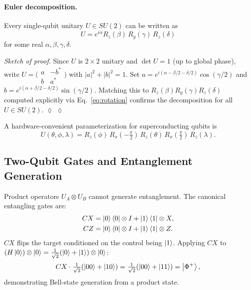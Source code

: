\documentclass[aps, reprint, twocolumn, superscriptaddress, floatfix]{revtex4-2}
\newenvironment{proofsketch}[1][Sketch of proof]{%
  \par\smallskip\noindent\textit{#1.}\enspace}{%
  \hspace*{\fill}$\lozenge$\par\smallskip}
\begin{document}
\paragraph{Euler decomposition.}
Every single-qubit unitary $U \in SU(2)$ can be written as
\begin{equation}
  U = e^{i\alpha}R_z(\beta)\,R_y(\gamma)\,R_z(\delta)
  \label{eq:euler}
\end{equation}
for some real $\alpha,\beta,\gamma,\delta$.

\begin{proofsketch}
Since $U$ is $2\times2$ unitary and $\det U=1$ (up to global phase), write
$U = \bigl(\begin{smallmatrix}a & -b^* \\ b & a^*\end{smallmatrix}\bigr)$ with
$|a|^2+|b|^2=1$.  Set $a = e^{i(\alpha-\beta/2-\delta/2)}\cos(\gamma/2)$
and $b = e^{i(\alpha+\beta/2-\delta/2)}\sin(\gamma/2)$.
Matching this to $R_z(\beta)R_y(\gamma)R_z(\delta)$ computed explicitly via
Eq.~\eqref{eq:rotation} confirms the decomposition for all $U \in SU(2)$. $\lozenge$
\end{proofsketch}

A hardware-convenient parameterization for superconducting qubits is
\begin{equation}
  U(\theta,\phi,\lambda) = R_z(\phi)\,R_x\!\left(-\tfrac{\pi}{2}\right)\,R_z(\theta)\,R_x\!\left(\tfrac{\pi}{2}\right)\,R_z(\lambda).
  \label{eq:ibm-u3}
\end{equation}

\subsection{Two-Qubit Gates and Entanglement Generation}
\label{ssec:two-qubit}

Product operators $U_A \otimes U_B$ cannot generate entanglement.  The canonical
entangling gates are:
\begin{align}
  CX &= \ket{0}\bra{0}\otimes I + \ket{1}\bra{1}\otimes X, \\
  CZ &= \ket{0}\bra{0}\otimes I + \ket{1}\bra{1}\otimes Z.
\end{align}
$CX$ flips the target conditioned on the control being $\ket{1}$.  Applying $CX$
to $(H\ket{0})\otimes\ket{0} = \tfrac{1}{\sqrt{2}}(\ket{0}+\ket{1})\otimes\ket{0}$:
\begin{equation}
  CX\cdot\tfrac{1}{\sqrt{2}}(\ket{00}+\ket{10})
  = \tfrac{1}{\sqrt{2}}(\ket{00}+\ket{11}) = \ket{\Phi^+},
\end{equation}
demonstrating Bell-state generation from a product state.
\end{document}
